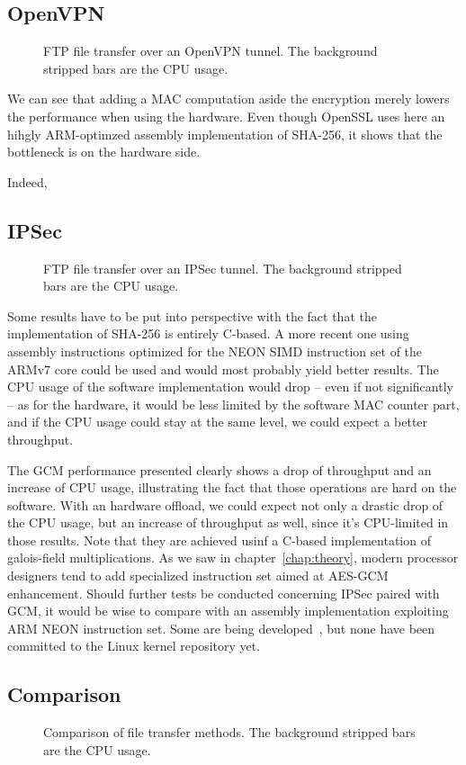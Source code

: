 \subsection{OpenVPN}

\begin{figure}[ht]

\caption{FTP file transfer over an OpenVPN tunnel. The background stripped bars are the CPU usage.}{}
\label{fig:openvpn-ftp-bench}
\end{figure}

We can see that adding a MAC computation aside the encryption merely lowers the performance when using the hardware.
Even though OpenSSL uses here an hihgly ARM-optimzed assembly implementation of SHA-256, it shows that the bottleneck is on the hardware side.

Indeed, 

\subsection{IPSec}

\begin{figure}[ht]

\caption{FTP file transfer over an IPSec tunnel. The background stripped bars are the CPU usage.}{}
\label{fig:ipsec-ftp-bench}
\end{figure}

Some results have to be put into perspective with the fact that the implementation of SHA-256 is entirely C-based.
A more recent one using assembly instructions optimized for the NEON SIMD instruction set of the ARMv7 core could be used and would most probably yield better results.
The CPU usage of the software implementation would drop -- even if not significantly -- as for the hardware, it would be less limited by the software MAC counter part, and if the CPU usage could stay at the same level, we could expect a better throughput.

The GCM performance presented clearly shows a drop of throughput and an increase of CPU usage, illustrating the fact that those operations are hard on the software.
With an hardware offload, we could expect not only a drastic drop of the CPU usage, but an increase of throughput as well, since it's CPU-limited in those results.
Note that they are achieved usinf a C-based implementation of galois-field multiplications.
As we saw in chapter~\ref{chap:theory}, modern processor designers tend to add specialized instruction set aimed at AES-GCM enhancement.
Should further tests be conducted concerning IPSec paired with GCM, it would be wise to compare with an assembly implementation exploiting ARM NEON instruction set.
Some are being developed~\cite{Conrado2013,Danilo2013}, but none have been committed to the Linux kernel repository yet.

\subsection{Comparison}

\begin{figure}[ht]

\caption{Comparison of file transfer methods. The background stripped bars are the CPU usage.}{}
\label{fig:ftp-bench-comparison}
\end{figure}